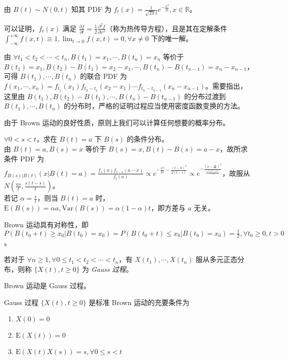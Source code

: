 \documentclass[../main.tex]{subfiles}
\begin{document}
由 $B(t)\sim N(0,t)$ 知其 PDF 为 $f_t(x)=\frac1{\sqrt{2\pi}t}e^{-\frac{x^2}{2t}},x\in\mathbb R$。

可以证明，$f_t(x)$ 满足 $\frac{\partial f}{\partial t}=\frac12\frac{\partial^2f}{\partial x^2}$（称为热传导方程），且是其在定解条件 $\int_{-\infty}^{+\infty}f(x,t)\equiv1,\lim_{t\rightarrow0}f(x,t)=0,\forall x\neq0$ 下的唯一解。

由 $\forall t_1<t_2<\cdots<t_n,B(t_1)=x_1,\cdots,B(t_n)=x_n$ 等价于 $B(t_1)=x_1,B(t_2)-B(t_1)=x_2-x_1,\cdots,B(t_n)-B(t_{n-1})=x_n-x_{n-1}$，可得 $B(t_1),\cdots,B(t_n)$ 的联合 PDF 为 $f(x_1,\cdots,x_n)=f_{t_1}(x_1)f_{t_2-t_1}(x_2-x_1)\cdots f_{t_n-t_{n-1}}(x_n-x_{n-1})$。需要指出，这里由 $B(t_1),B(t_2)-B(t_1),\cdots,B(t_n)-B(t_{n-1})$ 的分布过渡到 $B(t_1),\cdots,B(t_n)$ 的分布时，严格的证明过程应当使用密度函数变换的方法。

由于 Brown 运动的良好性质，原则上我们可以计算任何想要的概率分布。

\begin{example}
    $\forall0<s<t$，求在 $B(t)=a$ 下 $B(s)$ 的条件分布。\\
    由 $B(t)=a,B(s)=x$ 等价于 $B(s)=x,B(t)-B(s)=a-x$，故所求条件 PDF 为 $f_{B(s)|B(t)}(x|B(t)=a)=\frac{f_s(x)f_{t-s}(a-x)}{f_t(a)}\propto e^{-\frac{x^2}{2s}-\frac{(x-a)^2}{2(t-s)}}\propto e^{-\frac{(x-\frac{as}t)^2}{2\frac{s(t-s)}t}}$，故服从 $N(\frac{as}t,\frac{s(t-s)}t)$。\\
    若记 $\alpha=\frac st$，则当 $B(t)=a$ 时，$\mathrm E(B(s))=\alpha a,\mathrm{Var}(B(s))=\alpha(1-\alpha)t$，即方差与 $a$ 无关。
\end{example}

\begin{proposition}
    Brown 运动具有对称性，即 $P(B(t_0+t)\geq x_0|B(t_0)=x_0)=P(B(t_0+t)\leq x_0|B(t_0)=x_0)=\frac12,\forall t_0\geq0,t>0$。
\end{proposition}

\begin{definition}\label{def:8.2.1}
    若对于 $\forall n\geq1,\forall0\leq t_1<t_2<\cdots<t_n$，有 $X(t_1),\cdots,X(t_n)$ 服从多元正态分布，则称 $\{X(t),t\geq0\}$ 为 \emph{Gauss 过程}。
\end{definition}

Brown 运动是 Gauss 过程。

\begin{theorem}\label{thm:8.2.1}
    Gauss 过程 $\{X(t),t\geq0\}$ 是标准 Brown 运动的充要条件为
    \begin{enumerate}
        \item $X(0)=0$
        \item $\mathrm E(X(t))=0$
        \item $\mathrm E(X(t)X(s))=s,\forall0\leq s<t$
    \end{enumerate}
\end{theorem}
\end{document}
